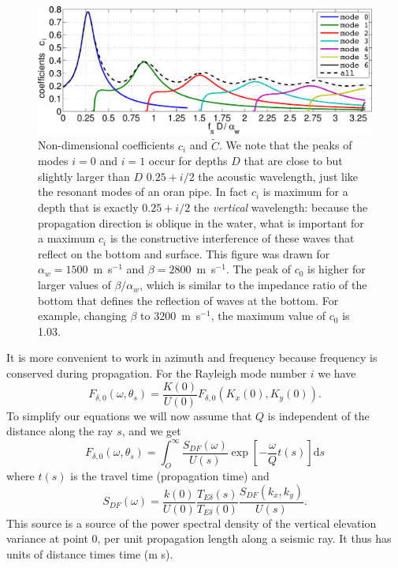 \begin{figure}[htb]
\centerline{\includegraphics[width=\textwidth]{FIGS_CH_SISMO/Rayleigh_cn.pdf}}
  \caption{Non-dimensional coefficients $c_i$ and $\widetilde{C}$. 
  We note that the peaks of modes $i=0$ and $i=1$ occur for depths $D$ that are close to but slightly larger than   $D$ 
 $0.25+i/2$ the acoustic wavelength, just like the resonant modes of an oran pipe. In fact $c_i$ is maximum for a depth  that is 
 exactly $0.25+i/2$ the \emph{vertical} wavelength: because the propagation direction is oblique in the water, what is important for a maximum $c_i$ 
 is the constructive interference of these waves that reflect on the bottom and surface. This figure was drawn for  $\alpha_w=1500$~m~s$^{-1}$ 
 and $\beta=2800$~m~s$^{-1}$. 
The peak of $c_0$ is higher for larger values of  $\beta/\alpha_w$, which is similar to the impedance ratio of the bottom 
that defines the reflection of waves at the bottom. For example, changing $\beta$ to   $3200$~m~s$^{-1}$, the maximum value of $c_0$ is 1.03.}
\label{fig:sismo_coef}
\end{figure}

It is more convenient to work in azimuth and frequency 
because frequency is conserved during propagation.
For the Rayleigh mode number $i$ we have 
\begin{equation}
 F_{\delta,0}(\omega,\theta_s) =  \frac{K(0)}{U(0)} F_{\delta,0}(K_{x}(0),K_{y}(0)).
\end{equation}
To simplify our equations we will now assume that $Q$ is independent of the distance along the ray $s$, and we get 
\begin{equation}
 F_{\delta,0}(\omega,\theta_s) = \int_O^\infty \frac{S_{DF}(\omega)}{U(s)} \exp\left[-\frac{\omega}{Q} t(s)\right] \mathrm{d} s
\end{equation}
where $t(s)$ is the travel time (propagation time) and 
\begin{equation}
 S_{DF}(\omega)=\frac{k(0)}{U(0)} \frac{T_{E \delta}(s)}{T_{E \delta}(0)} \frac{S_{DF}(k_x,k_y)}{U(s)}.
\end{equation}
This source is a source of the power spectral density of the vertical 
elevation variance at point 0, per unit propagation length along a seismic ray. It thus has units of distance times time (m s). 

